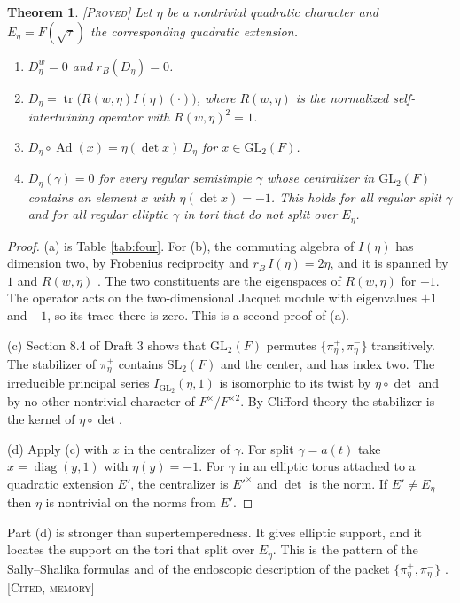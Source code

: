 \documentclass[12pt,letterpaper]{amsart}
\numberwithin{equation}{section}
\newtheorem{theorem}{Theorem}[section]
\theoremstyle{definition}
\theoremstyle{remark}
\newcommand{\tr}{\operatorname{tr}}
\newcommand{\status}[1]{\textup{[\textsc{#1}]}}
\begin{document}
\begin{theorem}\label{thm:Deta}\status{Proved}
Let $\eta$ be a nontrivial quadratic character and $E_\eta=F(\sqrt\tau)$ the corresponding quadratic extension.
\begin{enumerate}[label=(\alph*),leftmargin=*]
\item $D_\eta^w=0$ and $r_B(D_\eta)=0$.
\item $D_\eta=\tr\bigl(R(w,\eta)I(\eta)(\cdot)\bigr)$, where $R(w,\eta)$ is the normalized self-intertwining operator with $R(w,\eta)^2=1$.
\item $D_\eta\circ\operatorname{Ad}(x)=\eta(\det x)\,D_\eta$ for $x\in\mathrm{GL}_2(F)$.
\item $D_\eta(\gamma)=0$ for every regular semisimple $\gamma$ whose centralizer in $\mathrm{GL}_2(F)$ contains an element $x$ with $\eta(\det x)=-1$. This holds for all regular split $\gamma$ and for all regular elliptic $\gamma$ in tori that do not split over $E_\eta$.
\end{enumerate}
\end{theorem}
\begin{proof}
(a) is Table \ref{tab:four}. For (b), the commuting algebra of $I(\eta)$ has dimension two, by Frobenius reciprocity and $r_B\,I(\eta)=2\eta$, and it is spanned by $1$ and $R(w,\eta)$ \cite{Ke82}. The two constituents are the eigenspaces of $R(w,\eta)$ for $\pm1$. The operator acts on the two-dimensional Jacquet module with eigenvalues $+1$ and $-1$, so its trace there is zero. This is a second proof of (a).

(c) Section 8.4 of Draft 3 shows that $\mathrm{GL}_2(F)$ permutes $\{\pi_\eta^+,\pi_\eta^-\}$ transitively. The stabilizer of $\pi_\eta^+$ contains $\mathrm{SL}_2(F)$ and the center, and has index two. The irreducible principal series $I_{\mathrm{GL}_2}(\eta,1)$ is isomorphic to its twist by $\eta\circ\det$ and by no other nontrivial character of $F^\times/F^{\times2}$. By Clifford theory the stabilizer is the kernel of $\eta\circ\det$.

(d) Apply (c) with $x$ in the centralizer of $\gamma$. For split $\gamma=a(t)$ take $x=\operatorname{diag}(y,1)$ with $\eta(y)=-1$. For $\gamma$ in an elliptic torus attached to a quadratic extension $E'$, the centralizer is $E'^\times$ and $\det$ is the norm. If $E'\ne E_\eta$ then $\eta$ is nontrivial on the norms from $E'$.
\end{proof}
Part (d) is stronger than supertemperedness. It gives elliptic support, and it locates the support on the tori that split over $E_\eta$. This is the pattern of the Sally--Shalika formulas \cite{SS68} and of the endoscopic description of the packet $\{\pi_\eta^+,\pi_\eta^-\}$ \cite{LL79}. \status{Cited, memory}
\end{document}
